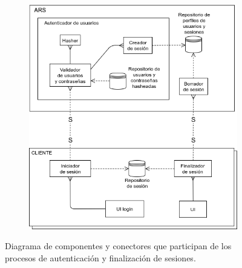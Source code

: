\begin{figure}[H]
  \begin{subfigure}{\textwidth}
    \includegraphics[width=\textwidth]{imagenes/diagramas/loginYLogout.png}
  \end{subfigure}
  \caption{Diagrama de componentes y conectores que participan de los procesos de autenticación y finalización de sesiones.}
  \label{fig:dia_cyc_autenticacion}
\end{figure}



\newpage
